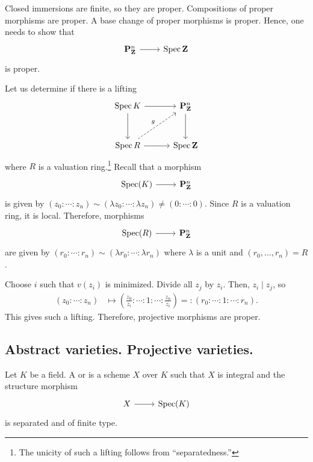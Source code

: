 \documentclass [11 pt, oneside] {article}
\begin{document}
Closed immersions are finite, so they are proper. Compositions of proper morphisms are proper. A base change of proper morphisms is proper. Hence, one needs to show that
\[
\begin{tikzcd}
\mathbf{P}^n_{\mathbf{Z}}\ar[r]& \Spec \mathbf{Z}
\end{tikzcd}
\] 
is proper. 

Let us determine if there is a lifting
\[
\begin{tikzcd}[row sep = 3 em, column sep = 3 em]
	\Spec K \ar[r]\ar[d] & \mathbf{P}^n_{\mathbf{Z}}\ar[d] \\ \Spec R \ar[r]\ar[ur,dashed,"g"] &\Spec \mathbf{Z}
\end{tikzcd}
\]
where $R$ is a valuation ring.\footnote{The unicity of such a lifting follows from ``separatedness.''} Recall that a morphism 
\[
\begin{tikzcd}
\Spec (K) \ar[r]& \mathbf{P}^n_{\mathbf{Z}}
\end{tikzcd}
\]   
is given by $(z_0:\cdots:z_n)\sim (\lambda z_0 : \cdots :\lambda z_n)\ne(0:\cdots:0)$. Since $R$ is a valuation ring, it is local. Therefore, morphisms 
\[
\begin{tikzcd}
\Spec(R)\ar[r]& \mathbf{P}^n_{\mathbf{Z}}
\end{tikzcd}
\] 
are given by $(r_0:\cdots:r_n)\sim(\lambda r_0:\cdots: \lambda r_n)$ where $\lambda$ is a unit and $(r_0,\hdots, r_n)= R$.

Choose $i$ such that $v(z_i)$ is minimized. Divide all $z_j$ by $z_i$. Then, $z_i \mid z_j$, so
\begin{align*}
	(z_0:\cdots:z_n)&\longmapsto \left( \frac{z_0}{z_i} : \cdots : 1 : \cdots: \frac{z_n}{z_i} \right) =: (r_0:\cdots:1:\cdots:r_n).
\end{align*}
This gives such a lifting. Therefore, projective morphisms are proper.

\subsection{Abstract varieties. Projective varieties.}

\begin{definition}\label{}\text{}
Let $K$ be a field. A  or  is a scheme $X$ over $K$ such that $X$ is integral and the structure morphism \[
\begin{tikzcd}
X\ar[r]&\Spec(K)
\end{tikzcd}
\] 
is separated and of finite type.
\end{definition}
\end{document}
